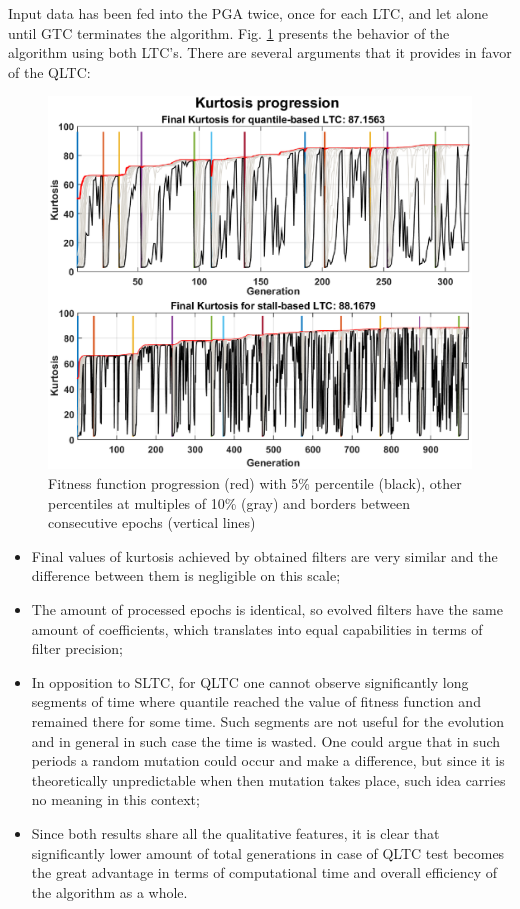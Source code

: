 \documentclass{svproc}
\begin{document}
Input data has been fed into the PGA twice, once for each LTC, and let alone until GTC terminates the algorithm. Fig. \ref{fig:progress} presents the behavior of the algorithm using both LTC's. There are several arguments that it provides in favor of the QLTC:

\begin{figure}[ht!]
\centering
\includegraphics[width=\textwidth]{figs/progress.eps}
\caption{Fitness function progression (red) with 5\% percentile (black), other percentiles at multiples of 10\% (gray) and borders between consecutive epochs (vertical lines)}
\label{fig:progress}
\end{figure}

\begin{itemize}
    \item Final values of kurtosis achieved by obtained filters are very similar and the difference between them is negligible on this scale;
    \item The amount of processed epochs is identical, so evolved filters have the same amount of coefficients, which translates into equal capabilities in terms of filter precision;
    \item In opposition to SLTC, for QLTC one cannot observe significantly long segments of time where quantile reached the value of fitness function and remained there for some time. Such segments are not useful for the evolution and in general in such case the time is wasted. One could argue that in such periods a random mutation could occur and make a difference, but since it is theoretically unpredictable when then mutation takes place, such idea carries no meaning in this context;
    \item Since both results share all the qualitative features, it is clear that significantly lower amount of total generations in case of QLTC test becomes the great advantage in terms of computational time and overall efficiency of the algorithm as a whole. 
\end{itemize}
\end{document}
